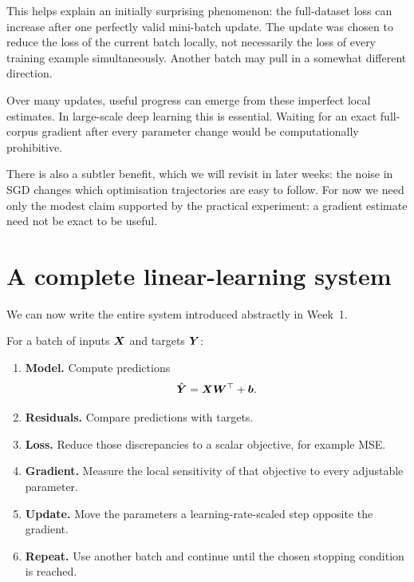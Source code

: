 This helps explain an initially surprising phenomenon: the full-dataset loss can increase after one perfectly valid mini-batch update. The update was chosen to reduce the loss of the current batch locally, not necessarily the loss of every training example simultaneously. Another batch may pull in a somewhat different direction.

Over many updates, useful progress can emerge from these imperfect local estimates. In large-scale deep learning this is essential. Waiting for an exact full-corpus gradient after every parameter change would be computationally prohibitive.

There is also a subtler benefit, which we will revisit in later weeks: the noise in SGD changes which optimisation trajectories are easy to follow. For now we need only the modest claim supported by the practical experiment: a gradient estimate need not be exact to be useful.

\section{A complete linear-learning system}

We can now write the entire system introduced abstractly in Week~1.

For a batch of inputs \(\bm{X}\) and targets \(\bm{Y}\):

\begin{enumerate}[leftmargin=*]
  \item \textbf{Model.} Compute predictions
  \[
    \hat{\bm{Y}}=\bm{X}\bm{W}^{\top}+\bm{b}.
  \]

  \item \textbf{Residuals.} Compare predictions with targets.

  \item \textbf{Loss.} Reduce those discrepancies to a scalar objective, for example MSE.

  \item \textbf{Gradient.} Measure the local sensitivity of that objective to every adjustable parameter.

  \item \textbf{Update.} Move the parameters a learning-rate-scaled step opposite the gradient.

  \item \textbf{Repeat.} Use another batch and continue until the chosen stopping condition is reached.
\end{enumerate}

